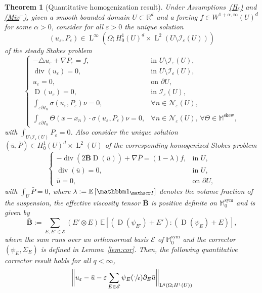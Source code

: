 \documentclass[10pt]{amsart}
\let\mathcal\mathscr
\newcommand{\Hd}{\hyperref[Hd]{\textup{(H$_\delta$)}}\xspace}
\newcommand{\Mix}{\hyperref[Mix+]{\textup{(Mix$^+$)}}\xspace}
\let\mathds\mathbbm
\theoremstyle{plain}
\newtheorem{theor1}{Theorem}
\theoremstyle{definition}
\newcommand{\e}{\varepsilon}
\newcommand{\Ec}{\mathcal E}
\newcommand{\R}{\mathbb R}
\newcommand{\Ic}{\mathcal I}
\newcommand{\Md}{\mathbb M}
\newcommand{\Nc}{\mathcal N}
\newcommand{\D}{\operatorname{D}}
\newcommand{\Bb}{\bar{\boldsymbol B}}
\newcommand{\Ld}{\operatorname{L}}
\newcommand{\Div}{{\operatorname{div}}}
\newcommand{\Sym}{{\operatorname{sym}}}
\newcommand{\Skew}{{\operatorname{skew}}}
\newcommand{\expec}[1]{\mathbb{E}\left[ #1 \right]}
\begin{document}
\begin{theor1}[Quantitative homogenization result]\label{th:hom-quant}
Under Assumptions~\emph{\Hd} and \emph{\Mix},
given a smooth bounded domain $U\subset\R^d$ and a forcing $f\in W^{1+\alpha,\infty}(U)^d$ for some $\alpha>0$, consider for all $\e>0$ the unique solution
\[
(u_\e,P_\e)\in\Ld^\infty(\Omega;H^1_0(U)^d\times\Ld^2(U\setminus\Ic_\e(U)))
\]
of the steady Stokes problem
\begin{equation}\label{eq:Stokes}
\begin{cases}
-\triangle u_\e+\nabla P_\e=f,&\text{in $U\setminus\Ic_\e(U)$},\\
\Div (u_\e)=0,&\text{in $U\setminus\Ic_\e(U)$},\\
u_\e=0,&\text{on $\partial U$},\\
\D(u_\e)=0,&\text{in $\Ic_\e(U)$},\\
\int_{\e\partial I_n}\sigma(u_\e,P_\e)\nu=0,&\forall n\in\Nc_\e(U),\\
\int_{\e\partial I_n}\Theta(x-x_n)\cdot\sigma(u_\e,P_\e)\nu=0,&\forall n\in\Nc_\e(U),\,\forall\Theta\in\Md^\Skew,
\end{cases}
\end{equation}
with $\int_{U\setminus\Ic_\e(U)}P_\e=0$.
Also consider the unique solution $(\bar u,\bar P)\in H^1_0(U)^d\times\Ld^2(U)$ of the corresponding homogenized Stokes problem
\begin{equation}\label{eq:Stokes-hom}
\begin{cases}
-\Div(2\Bb \D(\bar u))+\nabla\bar P=(1-\lambda) f ,&\text{in $U$},\\
\Div(\bar u)=0,&\text{in $U$},\\
\bar u=0,&\text{on $\partial U$},
\end{cases}
\end{equation}
with $\int_U\bar P=0$,
where $\lambda:=\expec{\mathds 1_{\Ic}}$ denotes the volume fraction of the suspension, the effective viscosity tensor $\Bb$ is positive definite on $\Md_0^\Sym$ and is given by
\begin{equation}\label{eq:def-B}
\Bb:= \sum_{E,E'\in\Ec}(E'\otimes E)\,\expec{(\D(\psi_{E'})+E'):(\D(\psi_{E})+E)},
\end{equation}
where the sum runs over an orthonormal basis $\Ec$ of $\Md_0^\Sym$ and the corrector $(\psi_E,\Sigma_E)$ is defined in Lemma~\ref{lem:cor}.
Then,
the following quantitative corrector result holds for all $q<\infty$,
\begin{multline}\label{eq:hom-quant0}
\bigg\|u_\e-\bar u-\e\sum_{E\in\Ec}\psi_E(\sfrac\cdot\e)\partial_E\bar u\bigg\|_{\Ld^q(\Omega;H^1(U))}\\

\end{multline}
\end{theor1}
\end{document}
